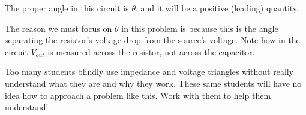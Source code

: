 





The proper angle in this circuit is $\theta$, and it will be a positive (leading) quantity.

\vskip 10pt

The reason we must focus on $\theta$ in this problem is because this is the angle separating the resistor's voltage drop from the source's voltage.  Note how in the circuit $V_{out}$ is measured across the resistor, not across the capacitor.







Too many students blindly use impedance and voltage triangles without really understand what they are and why they work.  These same students will have no idea how to approach a problem like this.  Work with them to help them understand!




